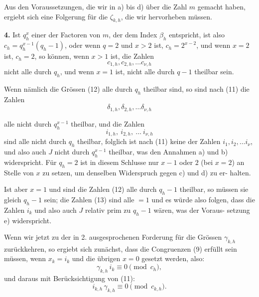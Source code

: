 \documentclass[12pt,a4paper]{article}
\begin{document}
Aus den Voraussetzungen, die wir in a) bis d) über die
Zahl $m$ gemacht haben, ergiebt sich eine Folgerung für die $\zeta_{k,h}$,
die wir hervorheben müssen.

\medskip
\noindent\textbf{4.} Ist $q_h^x$ einer der Factoren von $m$, der dem Index
$\beta_h$ entspricht, ist also $c_h = q_h^{x-1}(q_h-1)$, oder wenn
$q=2$ und $x > 2$ ist, $c_h = 2^{x-2}$, und wenn $x = 2$
ist, $c_h = 2$, so können, wenn $x > 1$ ist, die Zahlen
\begin{equation}\label{eq:k21-12}
c_{1,h}, c_{2,h}, \ldots c_{\nu,h}
\end{equation}
nicht alle durch $q_h$, und wenn $x = 1$ ist, nicht
alle durch $q-1$ theilbar sein.

Wenn nämlich die Grössen (12) alle durch $q_h$ theilbar sind,
so sind nach (11) die Zahlen
\begin{equation}\label{eq:k21-13}
\delta_{1,h}, \delta_{2,h}, \ldots \delta_{\nu,h}
\end{equation}
\newpage

alle nicht durch $q_h^{x-1}$ theilbar, und die Zahlen
\begin{equation}\label{eq:k21-14}
i_{1,h},\ i_{2,h},\ \ldots\ i_{\nu,h}
\end{equation}
sind alle nicht durch $q_h$ theilbar, folglich ist nach (11) keine der
Zahlen $i_1, i_2, \ldots i_\nu$, und also auch $J$ nicht durch $q_h^{x-1}$ theilbar,
was den Annahmen a) und b) widerspricht. F\"ur $q_h = 2$ ist in
diesem Schlusse nur $x-1$ oder $2$ (bei $x=2$) an Stelle von $x$
zu setzen, um denselben Widerspruch gegen c) und d) zu er-
halten.

Ist aber $x = 1$ und sind die Zahlen (12) alle durch $q_h - 1$
theilbar, so m\"ussen sie gleich $q_h - 1$ sein; die Zahlen (13) sind
alle $= 1$ und es w\"urde also folgen, dass die Zahlen $i_k$ und
also auch $J$ relativ prim zu $q_h - 1$ w\"aren, was der Voraus-
setzung e) widerspricht.

Wenn wir jetzt zu der in 2. ausgesprochenen Forderung f\"ur
die Gr\"ossen $\gamma_{k,h}$ zur\"uckkehren, so ergiebt sich zun\"achst, dass
die Congruenzen (9) erf\"ullt sein m\"ussen, wenn $x_k = i_k$ und die
\"ubrigen $x = 0$ gesetzt werden, also:
\[\gamma_{k,h}\, i_k \equiv 0 \pmod{c_h},\]
und daraus mit Ber\"ucksichtigung von (11):
\[i_{k,h}\, \gamma_{k,h} \equiv 0 \pmod{c_{k,h}}.\]
\end{document}
